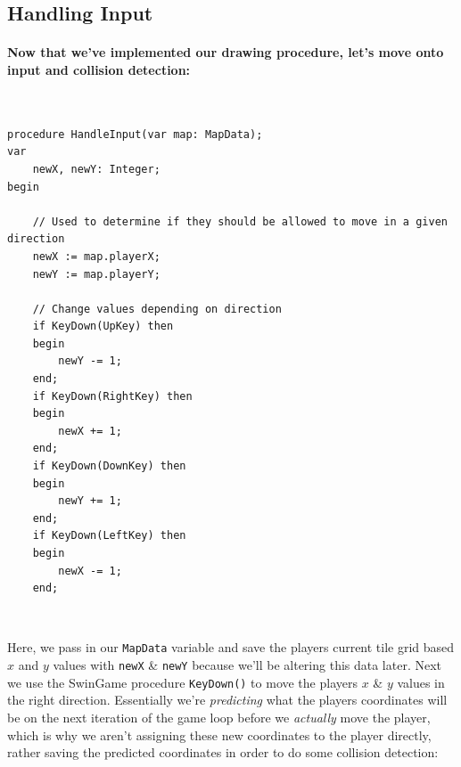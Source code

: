 \documentclass{article}
\begin{document}
\subsection{Handling Input}
\paragraph{Now that we've implemented our drawing procedure, let's move onto input and collision detection:}

 
 \vspace{0.5cm}
 \
 \begin{mdframed}[backgroundcolor=darkgray]
 \begin{verbatim}
procedure HandleInput(var map: MapData);
var
	newX, newY: Integer;
begin

	// Used to determine if they should be allowed to move in a given direction
	newX := map.playerX;
	newY := map.playerY;

	// Change values depending on direction
	if KeyDown(UpKey) then
	begin
		newY -= 1;
	end;
	if KeyDown(RightKey) then
	begin
		newX += 1;
	end;
	if KeyDown(DownKey) then
	begin
		newY += 1;
	end;
	if KeyDown(LeftKey) then
	begin
		newX -= 1;
	end;
 \end{verbatim}
 \end{mdframed}
 \
 
Here, we pass in our \texttt{MapData} variable and save the players current tile grid based $x$ and $y$ values with \texttt{newX} \& \texttt{newY} because we'll be altering this data later. Next we use the SwinGame procedure \texttt{KeyDown()} to move the players $x$ \& $y$ values in the right direction. Essentially we're \emph{predicting} what the players coordinates will be on the next iteration of the game loop before we \emph{actually} move the player, which is why we aren't assigning these new coordinates to the player directly, rather saving the predicted coordinates in order to do some collision detection:
 
 \clearpage
 
\end{document}
